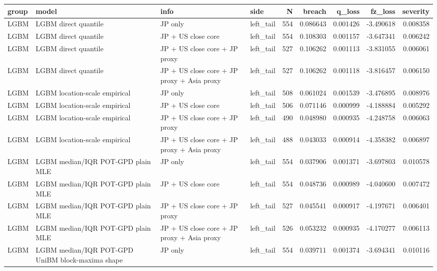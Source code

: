 \begin{tabular}{lll lrrrrr}
\toprule
group & model & info & side & N & breach & q_loss & fz_loss & severity \\
\midrule
LGBM & LGBM direct quantile & JP only & left\_tail & 554 & 0.086643 & 0.001426 & -3.490618 & 0.008358 \\
LGBM & LGBM direct quantile & JP + US close core & left\_tail & 554 & 0.108303 & 0.001157 & -3.647341 & 0.006242 \\
LGBM & LGBM direct quantile & JP + US close core + JP proxy & left\_tail & 527 & 0.106262 & 0.001113 & -3.831055 & 0.006061 \\
LGBM & LGBM direct quantile & JP + US close core + JP proxy + Asia proxy & left\_tail & 527 & 0.106262 & 0.001118 & -3.816457 & 0.006150 \\
LGBM & LGBM location-scale empirical & JP only & left\_tail & 508 & 0.061024 & 0.001539 & -3.476895 & 0.008976 \\
LGBM & LGBM location-scale empirical & JP + US close core & left\_tail & 506 & 0.071146 & 0.000999 & -4.188884 & 0.005292 \\
LGBM & LGBM location-scale empirical & JP + US close core + JP proxy & left\_tail & 490 & 0.048980 & 0.000935 & -4.248758 & 0.006063 \\
LGBM & LGBM location-scale empirical & JP + US close core + JP proxy + Asia proxy & left\_tail & 488 & 0.043033 & 0.000914 & -4.358382 & 0.006897 \\
LGBM & LGBM median/IQR POT-GPD plain MLE & JP only & left\_tail & 554 & 0.037906 & 0.001371 & -3.697803 & 0.010578 \\
LGBM & LGBM median/IQR POT-GPD plain MLE & JP + US close core & left\_tail & 554 & 0.048736 & 0.000989 & -4.040600 & 0.007472 \\
LGBM & LGBM median/IQR POT-GPD plain MLE & JP + US close core + JP proxy & left\_tail & 527 & 0.045541 & 0.000917 & -4.197671 & 0.006401 \\
LGBM & LGBM median/IQR POT-GPD plain MLE & JP + US close core + JP proxy + Asia proxy & left\_tail & 526 & 0.053232 & 0.000935 & -4.170277 & 0.006113 \\
LGBM & LGBM median/IQR POT-GPD UniBM block-maxima shape & JP only & left\_tail & 554 & 0.039711 & 0.001374 & -3.694341 & 0.010116 \\

\end{tabular}
